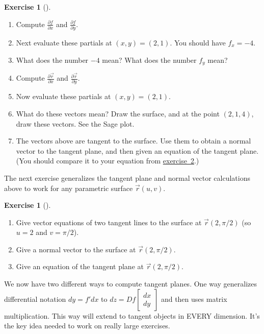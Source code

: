 \documentclass[10pt,]{book}
\theoremstyle{plain}
\theoremstyle{definition}
\theoremstyle{definition}
\theoremstyle{definition}
\theoremstyle{definition}
\newtheorem{exploration}[project]{Exercise}
\theoremstyle{definition}
\numberwithin{equation}{section}
\newcommand{\ds}{\displaystyle}
\begin{document}
\begin{exploration}[]\label{exploration-145}
\leavevmode%
\begin{enumerate}[font=\bfseries,label=(\alph*),ref=\alph*]
\item\label{task-323} Compute \(\ds \frac{\partial f}{\partial x}\) and \(\ds \frac{\partial f}{\partial y}\).%
\item\label{task-324} Next evaluate these partials at \((x,y)=(2,1)\). You should have \(f_x=-4\).%
\item\label{task-325} What does the number \(-4\) mean? What does the number \(f_y\) mean?%
\item\label{task-326} Compute \(\ds \frac{\partial \vec r}{\partial x}\) and \(\ds \frac{\partial \vec r}{\partial y}\).%
\item\label{task-327} Now evaluate these partials at \((x,y)=(2,1)\).%
\item\label{task-328} What do these vectors mean? Draw the surface, and at the point \((2,1,4)\), draw these vectors. See the Sage plot.%
%
\item\label{task-329} The vectors above are tangent to the surface. Use them to obtain a normal vector to the tangent plane, and then given an equation of the tangent plane. (You should compare it to your equation from \hyperref[prob_tangent_plane_downbowl]{exercise~2}.)%
\end{enumerate}
\end{exploration}
The next exercise generalizes the tangent plane and normal vector calculations above to work for any parametric surface \(\vec r(u,v)\).%
\begin{exploration}[]\label{exploration-146}
\leavevmode%
\begin{enumerate}[font=\bfseries,label=(\alph*),ref=\alph*]
\item\label{task-330} Give vector equations of two tangent lines to the surface at \(\vec r(2,\pi/2)\) (so \(u=2\) and \(v=\pi/2\)).%
\item\label{task-331} Give a normal vector to the surface at \(\vec r(2,\pi/2)\).%
\item\label{task-332} Give an equation of the tangent plane at \(\vec r(2,\pi/2)\).%
\end{enumerate}
\end{exploration}
We now have two different ways to compute tangent planes. One way generalizes differential notation \(dy=f'dx\) to \(dz = Df \begin{bmatrix}dx\\dy
\end{bmatrix}\) and then uses matrix multiplication. This way will extend to tangent objects in EVERY dimension. It's the key idea needed to work on really large exercises.%
\end{document}
